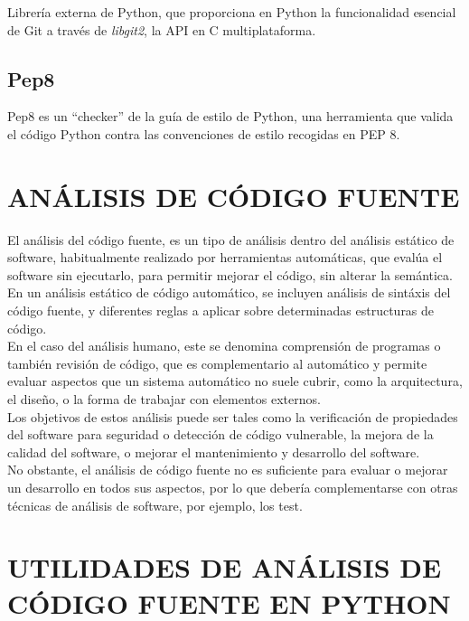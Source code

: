 Librería externa de Python, que proporciona en Python la funcionalidad esencial de Git a través de \textit{libgit2}, la API en C multiplataforma.


\subsection{Pep8} 
\label{sec:pep8}

Pep8 es un ``checker'' de la guía de estilo de Python, una herramienta que valida el código Python contra las convenciones de estilo recogidas en PEP 8.\\


\section{ANÁLISIS DE CÓDIGO FUENTE} 
\label{sec:anal_cod}

El análisis del código fuente, es un tipo de análisis dentro del análisis estático de software, habitualmente realizado por herramientas automáticas, que evalúa el software sin ejecutarlo, para permitir mejorar el código, sin alterar la semántica.\\


En un análisis estático de código automático, se incluyen análisis de sintáxis del código fuente, y diferentes reglas a aplicar sobre determinadas estructuras de código.\\


En el caso del análisis humano, este se denomina comprensión de programas o también revisión de código, que es complementario al automático y permite evaluar aspectos que un sistema automático no suele cubrir, como la arquitectura, el diseño, o la forma de trabajar con elementos externos.\\


Los objetivos de estos análisis puede ser tales como la verificación de propiedades del software para seguridad o detección de código vulnerable, la mejora de la calidad del software, o mejorar el mantenimiento y desarrollo del software.\\


No obstante, el análisis de código fuente no es suficiente para evaluar o mejorar un desarrollo en todos sus aspectos, por lo que debería complementarse con otras técnicas de análisis de software, por ejemplo, los test.\\


\section{UTILIDADES DE ANÁLISIS DE CÓDIGO FUENTE EN PYTHON} 
\label{sec:utilidades_cod}



